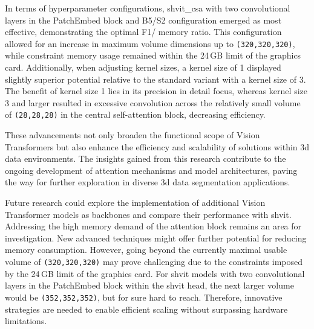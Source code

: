 In terms of hyperparameter configurations, \gls{shvit_csa} with two convolutional layers in the PatchEmbed block and B5/S2 configuration emerged as most effective, demonstrating the optimal F1/ memory ratio. This configuration allowed for an increase in maximum volume dimensions up to {\tt (320,320,320)}, while constraint memory usage remained within the 24\,GB limit of the graphics card. Additionally, when adjusting kernel sizes, a kernel size of 1 displayed slightly superior potential relative to the standard variant with a kernel size of 3. The benefit of kernel size 1 lies in its precision in detail focus, whereas kernel size 3 and larger resulted in excessive convolution across the relatively small volume of {\tt (28,28,28)} in the central self-attention block, decreasing efficiency.

\medskip

These advancements not only broaden the functional scope of Vision Transformers but also enhance the efficiency and scalability of solutions within \gls{3d} data environments. The insights gained from this research contribute to the ongoing development of attention mechanisms and model architectures, paving the way for further exploration in diverse \gls{3d} data segmentation applications.

\bigskip

Future research could explore the implementation of additional Vision Transformer models as backbones and compare their performance with \gls{shvit}. Addressing the high memory demand of the attention block remains an area for investigation. New advanced techniques might offer further potential for reducing memory consumption. However, going beyond the currently maximal usable volume of {\tt (320,320,320)} may prove challenging due to the constraints imposed by the 24\,GB limit of the graphics card. For \gls{shvit} models with two convolutional layers in the PatchEmbed block within the \gls{shvit} head, the next larger volume would be {\tt (352,352,352)}, but for sure hard to reach. Therefore, innovative strategies are needed to enable efficient scaling without surpassing hardware limitations.
